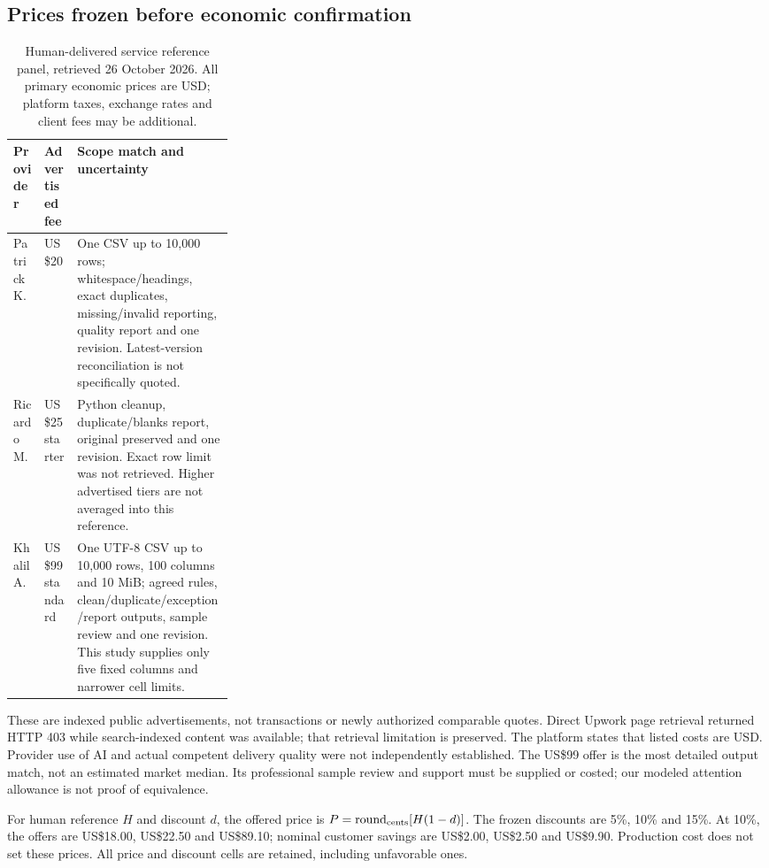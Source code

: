 \documentclass[11pt,letterpaper]{article}
\newcommand{\usd}[1]{US\$#1}
\begin{document}
\subsection{Prices frozen before economic confirmation}
\begin{table}[htbp]\small
\caption{Human-delivered service reference panel, retrieved 26 October 2026. All primary economic prices are USD; platform taxes, exchange rates and client fees may be additional.}
\begin{tabularx}{\linewidth}{@{}P{0.14\linewidth}P{0.15\linewidth}Y@{}}
\toprule
Provider & Advertised fee & Scope match and uncertainty \\
\midrule
Patrick K. & \usd{20} & One CSV up to 10,000 rows; whitespace/headings, exact duplicates, missing/invalid reporting, quality report and one revision. Latest-version reconciliation is not specifically quoted. \\
Ricardo M. & \usd{25} starter & Python cleanup, duplicate/blanks report, original preserved and one revision. Exact row limit was not retrieved. Higher advertised tiers are not averaged into this reference. \\
Khalil A. & \usd{99} standard & One UTF-8 CSV up to 10,000 rows, 100 columns and 10 MiB; agreed rules, clean/duplicate/exception/report outputs, sample review and one revision. This study supplies only five fixed columns and narrower cell limits. \\
\bottomrule
\end{tabularx}
\end{table}
These are indexed public advertisements, not transactions or newly authorized comparable quotes\cite{patrick,ricardo,khalil}. Direct Upwork page retrieval returned HTTP 403 while search-indexed content was available; that retrieval limitation is preserved. The platform states that listed costs are USD\cite{upworkcurrency}. Provider use of AI and actual competent delivery quality were not independently established. The \usd{99} offer is the most detailed output match, not an estimated market median. Its professional sample review and support must be supplied or costed; our modeled attention allowance is not proof of equivalence.

For human reference $H$ and discount $d$, the offered price is $P=\operatorname{round}_{\rm cents}[H(1-d)]$. The frozen discounts are 5\%, 10\% and 15\%. At 10\%, the offers are \usd{18.00}, \usd{22.50} and \usd{89.10}; nominal customer savings are \usd{2.00}, \usd{2.50} and \usd{9.90}. Production cost does not set these prices. All price and discount cells are retained, including unfavorable ones.
\end{document}
